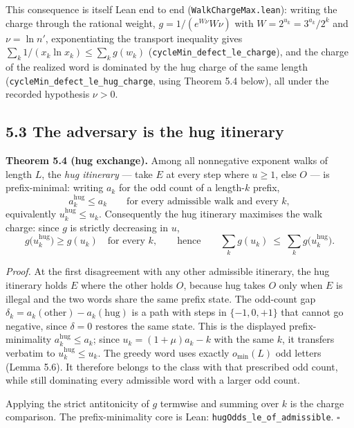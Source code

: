 \documentclass[12pt]{article}
\begin{document}
This consequence is itself Lean end to end
(\texttt{\nolinkurl{WalkChargeMax.lean}}): writing the charge through
the rational weight, \(g=1/(e^{W\nu}W\nu)\) with
\(W=2^{u_k}=3^{a_k}/2^k\) and \(\nu=\ln n'\), exponentiating the
transport inequality gives \(\sum_k 1/(x_k\ln x_k)\le\sum_k g(w_k)\)
(\texttt{\nolinkurl{cycleMin_defect_le_charge}}), and the charge of the
realized word is dominated by the hug charge of the same length
(\texttt{\nolinkurl{cycleMin_defect_le_hug_charge}}, using Theorem 5.4
below), all under the recorded hypothesis \(\nu>0\).

\subsection{5.3 The adversary is the hug
itinerary}\label{the-adversary-is-the-hug-itinerary}

\textbf{Theorem 5.4 (hug exchange).} Among all nonnegative exponent
walks of length \(L\), the \emph{hug itinerary} --- take \(E\) at every
step where \(u\ge 1\), else \(O\) --- is prefix-minimal: writing \(a_k\)
for the odd count of a length-\(k\) prefix, \[
a_k^{\mathrm{hug}}\le a_k
\qquad\text{for every admissible walk and every }k,
\] equivalently \(u_k^{\mathrm{hug}}\le u_k\). Consequently the hug
itinerary maximises the walk charge: since \(g\) is strictly decreasing
in \(u\), \[
g\bigl(u_k^{\mathrm{hug}}\bigr)\ge g(u_k)
\quad\text{for every }k,
\qquad\text{hence}\qquad
\sum_{k}g(u_k)\ \le\ \sum_{k}g\bigl(u_k^{\mathrm{hug}}\bigr).
\]

\emph{Proof.} At the first disagreement with any other admissible
itinerary, the hug itinerary holds \(E\) where the other holds \(O\),
because hug takes \(O\) only when \(E\) is illegal and the two words
share the same prefix state. The odd-count gap
\(\delta_k=a_k(\text{other})-a_k(\text{hug})\) is a path with steps in
\(\{-1,0,+1\}\) that cannot go negative, since \(\delta=0\) restores the
same state. This is the displayed prefix-minimality
\(a_k^{\mathrm{hug}}\le a_k\); since \(u_k=(1+\mu)a_k-k\) with the same
\(k\), it transfers verbatim to \(u_k^{\mathrm{hug}}\le u_k\). The
greedy word uses exactly \(o_{\min}(L)\) odd letters (Lemma 5.6). It
therefore belongs to the class with that prescribed odd count, while
still dominating every admissible word with a larger odd count.

Applying the strict antitonicity of \(g\) termwise and summing over
\(k\) is the charge comparison. The prefix-minimality core is Lean:
\texttt{\nolinkurl{hugOdds_le_of_admissible}}. \(\square\)
\end{document}

